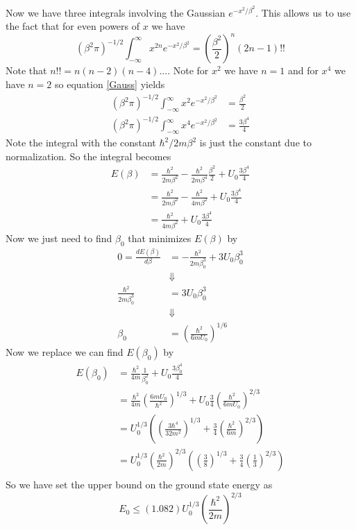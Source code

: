 \documentclass[11pt]{article}
\numberwithin{equation}{section}
\begin{document}
Now we have three integrals involving the Gaussian $e^{-x^2/\beta^2}$. This allows us to use the fact that for even powers of $x$ we have
\begin{equation} 
\left(\beta^2{\pi}\right)^{-1/2}\int_{-\infty}^{\infty} x^{2n}e^{-x^2/\beta^2} = \left(\frac{\beta^2}{2}\right)^{n}(2n-1)!!
\label{Gauss}
\end{equation} 
Note that $n!! = n(n-2)(n-4)...$. Note for $x^2$ we have $n=1$ and for $x^4$ we have $n=2$ so equation \ref{Gauss} yields
\begin{align*}
\left(\beta^2{\pi}\right)^{-1/2}\int_{-\infty}^{\infty} x^{2}e^{-x^2/\beta^2} &= \frac{\beta^2}{2}\\
\left(\beta^2{\pi}\right)^{-1/2}\int_{-\infty}^{\infty} x^{4}e^{-x^2/\beta^2} &= \frac{3\beta^4}{4}
\end{align*}
Note the integral with the constant $\hbar^2/2m\beta^2$ is just the constant due to normalization. So the integral becomes
\begin{align*}
E(\beta) &= \frac{\hbar^2}{2m\beta^2} - \frac{\hbar^2}{2m\beta^4}\frac{\beta^2}{2} + U_0\frac{3\beta^4}{4}\\
&= \frac{\hbar^2}{2m\beta^2} - \frac{\hbar^2}{4m\beta^2} + U_0\frac{3\beta^4}{4}\\
&= \frac{\hbar^2}{4m\beta^2} + U_0\frac{3\beta^4}{4}
\end{align*}
Now we just need to find $\beta_0$ that minimizes $E(\beta)$ by
\begin{align*}
0 = \frac{dE(\beta)}{d\beta} &= -\frac{\hbar^2}{2m\beta_0^3} + 3U_0\beta_0^3\\
&\Downarrow\\
\frac{\hbar^2}{2m\beta_0^3} &= 3U_0\beta_0^3\\
&\Downarrow\\
\beta_0 &= \left(\frac{\hbar^2}{6mU_0}\right)^{1/6}
\end{align*}
Now we replace we can find $E(\beta_0)$ by
\begin{align*}
E(\beta_0) &= \frac{\hbar^2}{4m}\frac{1}{\beta_0^2} + U_0\frac{3\beta_0^4}{4}\\
&= \frac{\hbar^2}{4m}\left(\frac{6mU_0}{\hbar^2}\right)^{1/3} + U_0\frac{3}{4} \left(\frac{\hbar^2}{6mU_0}\right)^{2/3}\\
&= U_0^{1/3}\left(\left(\frac{3\hbar^4}{32m^2}\right)^{1/3} + \frac{3}{4}\left(\frac{\hbar^2}{6m}\right)^{2/3}\right)\\
&= U_0^{1/3}\left(\frac{\hbar^2}{2m}\right)^{2/3}\left(\left(\frac{3}{8}\right)^{1/3} + \frac{3}{4}\left(\frac{1}{3}\right)^{2/3}\right)\\
\end{align*}
So we have set the upper bound on the ground state energy as
$$E_0\le(1.082)U_0^{1/3}\left(\frac{\hbar^2}{2m}\right)^{2/3}$$
\end{document}
